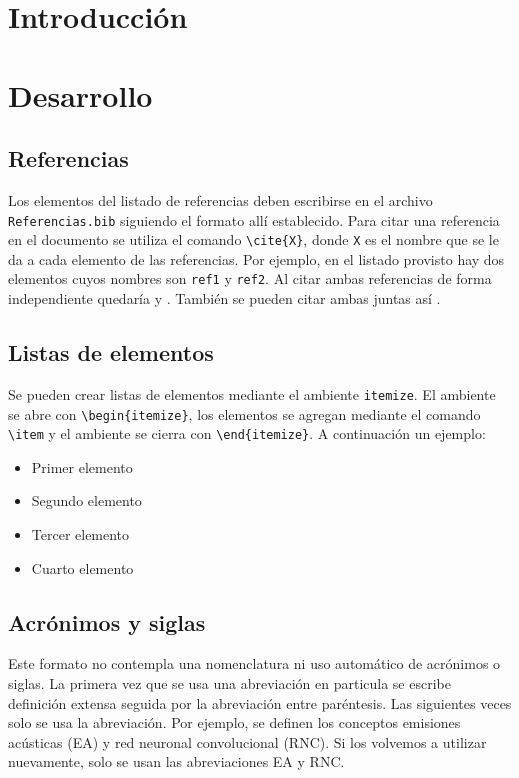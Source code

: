 \documentclass[a4paper, titletoc, 12pt]{article}
\begin{document}
\section*{Introducción}
\lipsum[1-3]

\section*{Desarrollo}

\subsection*{Referencias}
Los elementos del listado de referencias deben escribirse en el archivo \verb!Referencias.bib! siguiendo el formato allí establecido. Para citar una referencia en el documento se utiliza el comando \verb!\cite{X}!, donde \verb!X! es el nombre que se le da a cada elemento de las referencias. Por ejemplo, en el listado provisto hay dos elementos cuyos nombres son \verb!ref1! y \verb!ref2!. Al citar ambas referencias de forma independiente quedaría \cite{ref1} y \cite{ref2}. También se pueden citar ambas juntas así \cite{ref1, ref2}.

\subsection*{Listas de elementos}
Se pueden crear listas de elementos mediante el ambiente \verb!itemize!. El ambiente se abre con \verb!\begin{itemize}!, los elementos se agregan mediante el comando \verb!\item! y el ambiente se cierra con \verb!\end{itemize}!. A continuación un ejemplo:

\begin{itemize}
    \item Primer elemento
    \item Segundo elemento
    \item Tercer elemento
    \item Cuarto elemento
\end{itemize}

\subsection*{Acrónimos y siglas}
Este formato no contempla una nomenclatura ni uso automático de acrónimos o siglas. La primera vez que se usa una abreviación en particula se escribe definición extensa seguida por la abreviación entre paréntesis. Las siguientes veces solo se usa la abreviación. Por ejemplo, se definen los conceptos emisiones acústicas (EA) y red neuronal convolucional (RNC). Si los volvemos a utilizar nuevamente, solo se usan las abreviaciones EA y RNC.
\end{document}

